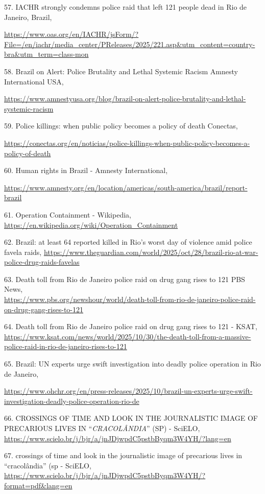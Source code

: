 57. IACHR strongly condemns police raid that left 121 people dead in Rio de Janeiro, Brazil,

\url{https://www.oas.org/en/IACHR/jsForm/?File=/en/iachr/media_center/PReleases/2025/221.asp&utm_content=country-bra&utm_term=class-mon}

58. Brazil on Alert: Police Brutality and Lethal Systemic Racism \textbar{} Amnesty International USA,

\url{https://www.amnestyusa.org/blog/brazil-on-alert-police-brutality-and-lethal-systemic-racism}

59. Police killings: when public policy becomes a policy of death \textbar{} Conectas,

\url{https://conectas.org/en/noticias/police-killings-when-public-policy-becomes-a-policy-of-death}

60. Human rights in Brazil - Amnesty International,

\url{https://www.amnesty.org/en/location/americas/south-america/brazil/report-brazil}

61. Operation Containment - Wikipedia, \url{https://en.wikipedia.org/wiki/Operation_Containment}

62. Brazil: at least 64 reported killed in Rio's worst day of violence amid police favela raids, \url{https://www.theguardian.com/world/2025/oct/28/brazil-rio-at-war-police-drug-raids-favelas}

63. Death toll from Rio de Janeiro police raid on drug gang rises to 121 \textbar{} PBS News,\\
\url{https://www.pbs.org/newshour/world/death-toll-from-rio-de-janeiro-police-raid-on-drug-gang-rises-to-121}

64. Death toll from Rio de Janeiro police raid on drug gang rises to 121 - KSAT, \url{https://www.ksat.com/news/world/2025/10/30/the-death-toll-from-a-massive-police-raid-in-rio-de-janeiro-rises-to-121}

65. Brazil: UN experts urge swift investigation into deadly police operation in Rio de Janeiro,

\url{https://www.ohchr.org/en/press-releases/2025/10/brazil-un-experts-urge-swift-investigation-deadly-police-operation-rio-de}

66. CROSSINGS OF TIME AND LOOK IN THE JOURNALISTIC IMAGE OF PRECARIOUS LIVES IN ``\emph{CRACOLÂNDIA}'' (SP) - SciELO, \url{https://www.scielo.br/j/bjr/a/jnJDjwpdC5pstbByqm3W4YH/?lang=en}

67. crossings of time and look in the journalistic image of precarious lives in ``cracolândia'' (sp - SciELO, \url{https://www.scielo.br/j/bjr/a/jnJDjwpdC5pstbByqm3W4YH/?format=pdf&lang=en}

